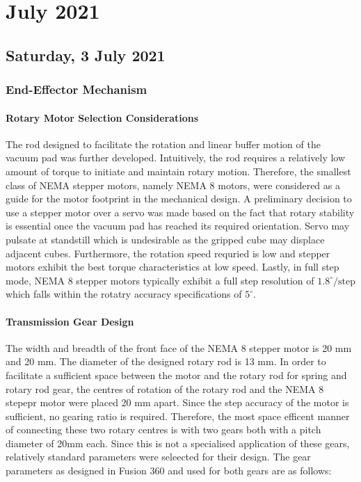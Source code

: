 \chapter[2021 July]{July 2021}

\section[2021/07/03]{Saturday, 3 July 2021}

\subsection{End-Effector Mechanism}

\subsubsection{Rotary Motor Selection Considerations}

The rod designed to facilitate the rotation and linear buffer motion of the vacuum pad was further developed. Intuitively, the rod requires a relatively low amount of torque to initiate and maintain rotary motion. Therefore, the smallest class of \ac{NEMA} stepper motors, namely \ac{NEMA} 8 motors, were considered as a guide for the motor footprint in the mechanical design. A preliminary decision to use a stepper motor over a servo was made based on the fact that rotary stability is essential once the vacuum pad has reached its required orientation. Servo may pulsate at standstill which is undesirable as the gripped cube may displace adjacent cubes. Furthermore, the rotation speed requried is low and stepper motors exhibit the best torque characteristics at low speed. Lastly, in full step mode, NEMA 8 stepper motors typically exhibit a full step resolution of $1.8 ^\circ / \text{step}$ which falls within the rotatry accuracy specifications of $5 ^\circ$.

\subsubsection{Transmission Gear Design}

The width and breadth of the front face of the \ac{NEMA} 8 stepper motor is 20 mm and 20 mm. The diameter of the designed rotary rod is 13 mm. In order to facilitate a sufficient space between the motor and the rotary rod for spring and rotary rod gear, the centres of rotation of the rotary rod and the \ac{NEMA} 8 stepepr motor were placed 20 mm apart. Since the step accuracy of the motor is sufficient, no gearing ratio is required. Therefore, the most space efficent manner of connecting these two rotary centres is with two gears both with a pitch diameter of 20mm each. Since this is not a specialised application of these gears, relatively standard parameters were seleected for their design. The gear parameters as designed in Fusion 360 and used for both gears are as follows:

